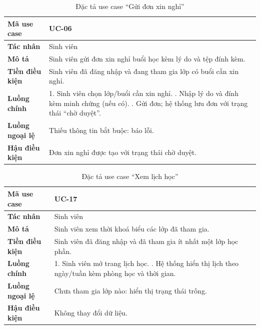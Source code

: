 \begin{table}[H]
\centering
\small
\caption{Đặc tả use case ``Gửi đơn xin nghỉ''}
\label{tab:uc-absence}
\begin{tabular}{|p{3cm}|p{10.6cm}|}
\hline
\textbf{Mã use case} & UC-06 \\ \hline
\textbf{Tác nhân} & Sinh viên \\ \hline
\textbf{Mô tả} & Sinh viên gửi đơn xin nghỉ buổi học kèm lý do và tệp đính kèm. \\ \hline
\textbf{Tiền điều kiện} & Sinh viên đã đăng nhập và đang tham gia lớp có buổi cần xin nghỉ. \\ \hline
\textbf{Luồng chính} & 1. Sinh viên chọn lớp/buổi cần xin nghỉ. \newline 2. Nhập lý do và đính kèm minh chứng (nếu có). \newline 3. Gửi đơn; hệ thống lưu đơn với trạng thái ``chờ duyệt''. \\ \hline
\textbf{Luồng ngoại lệ} & Thiếu thông tin bắt buộc: báo lỗi. \\ \hline
\textbf{Hậu điều kiện} & Đơn xin nghỉ được tạo với trạng thái chờ duyệt. \\ \hline
\end{tabular}
\end{table}

\begin{table}[H]
\centering
\small
\caption{Đặc tả use case ``Xem lịch học''}
\label{tab:uc-schedule}
\begin{tabular}{|p{3cm}|p{10.6cm}|}
\hline
\textbf{Mã use case} & UC-17 \\ \hline
\textbf{Tác nhân} & Sinh viên \\ \hline
\textbf{Mô tả} & Sinh viên xem thời khoá biểu các lớp đã tham gia. \\ \hline
\textbf{Tiền điều kiện} & Sinh viên đã đăng nhập và đã tham gia ít nhất một lớp học phần. \\ \hline
\textbf{Luồng chính} & 1. Sinh viên mở trang lịch học. \newline 2. Hệ thống hiển thị lịch theo ngày/tuần kèm phòng học và thời gian. \\ \hline
\textbf{Luồng ngoại lệ} & Chưa tham gia lớp nào: hiển thị trạng thái trống. \\ \hline
\textbf{Hậu điều kiện} & Không thay đổi dữ liệu. \\ \hline
\end{tabular}
\end{table}


